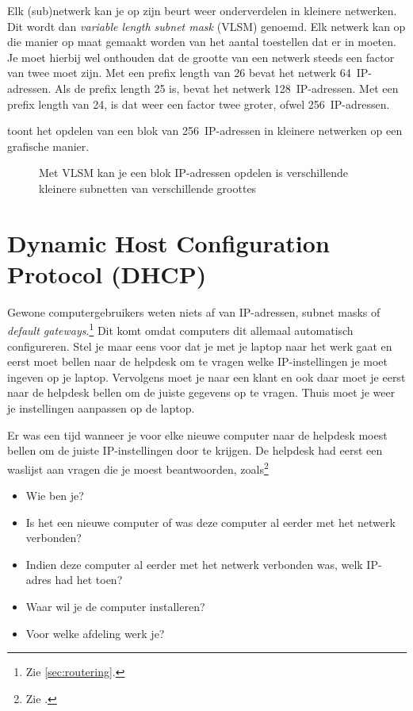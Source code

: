 Elk (sub)netwerk kan je op zijn beurt weer onderverdelen in kleinere netwerken.
Dit wordt dan \emph{variable length subnet mask} (VLSM) genoemd.
Elk netwerk kan op die manier op maat gemaakt worden van het aantal toestellen dat er in moeten.
Je moet hierbij wel onthouden dat de grootte van een netwerk steeds een factor van twee moet zijn.
Met een prefix length van 26 bevat het netwerk 64~IP-adressen.
Als de prefix length 25 is, bevat het netwerk 128~IP-adressen.
Met een prefix length van 24, is dat weer een factor twee groter, ofwel 256~IP-adressen.

 toont het opdelen van een blok van 256~IP-adressen in kleinere netwerken op een grafische manier.


\begin{figure}[hbp]
   \centering
   \caption{Met VLSM kan je een blok IP-adressen opdelen is verschillende kleinere subnetten van verschillende groottes}
   \label{fig:vlsm}
\end{figure}



\section{Dynamic Host Configuration Protocol (DHCP)}
\label{sec:dhcp}

Gewone computergebruikers weten niets af van IP-adressen, subnet masks of \emph{default gateways}.\footnote{Zie \vref{sec:routering}.}
Dit komt omdat computers dit allemaal automatisch configureren.
Stel je maar eens voor dat je met je laptop naar het werk gaat en eerst moet bellen naar de helpdesk om te vragen welke IP-instellingen je moet ingeven op je laptop.
Vervolgens moet je naar een klant en ook daar moet je eerst naar de helpdesk bellen om de juiste gegevens op te vragen.
Thuis moet je weer je instellingen aanpassen op de laptop.

Er was een tijd wanneer je voor elke nieuwe computer naar de helpdesk moest bellen om de juiste IP-instellingen door te krijgen.
De helpdesk had eerst een waslijst aan vragen die je moest beantwoorden, zoals\footnote{Zie \cite[4]{droms02}.}
\begin{itemize}
\item Wie ben je?
\item Is het een nieuwe computer of was deze computer al eerder met het netwerk verbonden?
\item Indien deze computer al eerder met het netwerk verbonden was, welk IP-adres had het toen?
\item Waar wil je de computer installeren?
\item Voor welke afdeling werk je?
\end{itemize}

